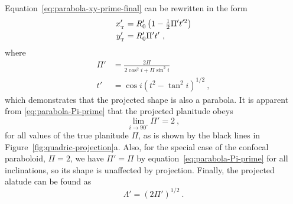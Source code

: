 Equation~\eqref{eq:parabola-xy-prime-final} can be rewritten in the
form
\begin{gather}
  \label{eq:parabola-xy-all-primes}
  \begin{aligned}
    x_{_{\mathrm{\scriptscriptstyle T}}}' &= R_0' \left(1  - \tfrac{1}{2} \Pi' t'^2\right) \\
    y_{_{\mathrm{\scriptscriptstyle T}}}' &= R_0' \Pi' t' \ ,
  \end{aligned}
\end{gather}
where
\begin{align}
  \label{eq:parabola-Pi-prime}
  \Pi' &= \frac{2 \Pi} {2 \cos^2 i + \Pi \sin^2 i} \\
  \label{eq:parabola-t-prime}
  t' &= \cos i \left(t^2 - \tan^2 i\right)^{1/2} \ ,
\end{align}
which demonstrates that the projected shape is also a parabola. It is
apparent from \eqref{eq:parabola-Pi-prime} that the projected
planitude obeys
\begin{equation*}
\lim_{i \to 90^\circ} \Pi' = 2 \ ,
\end{equation*}
for all values of the true planitude \(\Pi\), as is shown by the black
lines in Figure~\ref{fig:quadric-projection}a.  Also, for the special
case of the confocal paraboloid, \(\Pi = 2\), we have \(\Pi' = \Pi\) by
equation~\eqref{eq:parabola-Pi-prime} for all inclinations, so its
shape is unaffected by projection. Finally, the projected alatude can
be found as
\begin{equation}
  \label{eq:parabola-Lambda-prime}
  \Lambda' = \left( 2 \Pi' \right)^{1/2} \ .
\end{equation}
